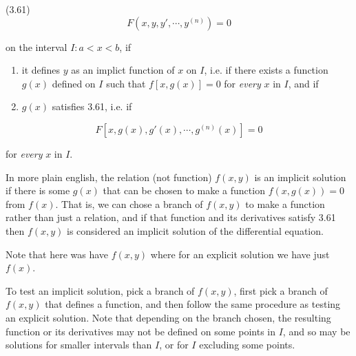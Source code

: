 \documentclass{article}
\begin{document}
(3.61) \[ F(x,y,y',\cdots,y^{(n)}) = 0 \]

on the \@{interval} $I: a < x < b$, if

\begin{enumerate}
\item it defines $y$ as an implict function of $x$ on $I$, i.e. if there exists a function $g(x)$ defined on $I$ such that $f[x,g(x)] = 0$ for \emph{every} $x$ in $I$, and if
\item $g(x)$ satisfies 3.61, i.e. if
\end{enumerate}

\[ F[x,g(x),g'(x),\cdots,g^{(n)}(x)] = 0 \]

for \emph{every} $x$ in $I$.

In more plain english, the relation (not function) $f(x,y)$ is an implicit solution if there is some $g(x)$ that can be chosen to make a function $f(x,g(x)) = 0$ from $f(x)$. That is, we can chose a branch of $f(x,y)$ to make a function rather than just a relation, and if that function and its derivatives satisfy 3.61 then $f(x,y)$ is considered an implicit solution of the differential equation.

Note that here was have $f(x,y)$ where for an explicit solution we have just $f(x)$.

To test an implicit solution, pick a branch of $f(x,y)$, first pick a branch of $f(x,y)$ that defines a function, and then follow the same procedure as testing an explicit solution. Note that depending on the branch chosen, the resulting function or its derivatives may not be defined on some points in $I$, and so may be solutions for smaller intervals than $I$, or for $I$ excluding some points.
\end{document}
